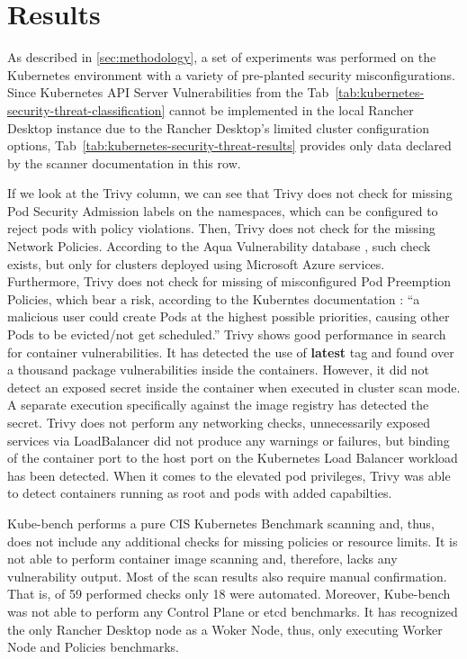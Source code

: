 \chapter{Results}
\label{chap:results}

As described in \ref{sec:methodology}, a set of experiments was performed on the Kubernetes environment with a variety of pre-planted security misconfigurations. Since Kubernetes API Server Vulnerabilities  from the Tab~\ref{tab:kubernetes-security-threat-classification} cannot be implemented in the local Rancher Desktop instance due to the Rancher Desktop's limited cluster configuration options, Tab~\ref{tab:kubernetes-security-threat-results} provides only data declared by the scanner documentation in this row.

If we look at the Trivy column, we can see that Trivy does not check for missing Pod Security Admission labels on the namespaces, which can be configured to reject pods with policy violations. Then, Trivy does not check for the missing Network Policies. According to the Aqua Vulnerability database \cite{aqua-vulnerability-database}, such check exists, but only for clusters deployed using Microsoft Azure services. Furthermore, Trivy does not check for missing of misconfigured Pod Preemption Policies, which bear a risk, according to the Kuberntes documentation \cite{pod-security-preemption}: ``a malicious user could create Pods at the highest possible priorities, causing other Pods to be evicted/not get scheduled.'' Trivy shows good performance in search for container vulnerabilities. It has detected the use of \textbf{latest} tag and found over a thousand package vulnerabilities inside the containers. However, it did not detect an exposed secret inside the container when executed in cluster scan mode. A separate execution specifically against the image registry has detected the secret. Trivy does not perform any networking checks, unnecessarily exposed services via LoadBalancer did not produce any warnings or failures, but binding of the container port to the host port on the Kubernetes Load Balancer workload has been detected. When it comes to the elevated pod privileges, Trivy was able to detect containers running as root and pods with added capabilties.

Kube-bench performs a pure CIS Kubernetes Benchmark scanning and, thus, does not include any additional checks for missing policies or resource limits. It is not able to perform container image scanning and, therefore, lacks any vulnerability output. Most of the scan results also require manual confirmation. That is, of 59 performed checks only 18 were automated. Moreover, Kube-bench was not able to perform any Control Plane or etcd benchmarks. It has recognized the only Rancher Desktop node as a Woker Node, thus, only executing Worker Node and Policies benchmarks.

